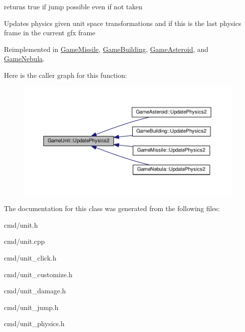 returns true if jump possible even if not taken 

Updates physics given unit space transformations and if this is the last physics frame in the current gfx frame 

Reimplemented in \hyperlink{classGameMissile_ab82fd3b8a814694c8df124d637bc9a45}{Game\+Missile}, \hyperlink{classGameBuilding_a41b1af4a3b09603e76b52cf7f7617482}{Game\+Building}, \hyperlink{classGameAsteroid_a7bc503988abf7084187034a723a08aed}{Game\+Asteroid}, and \hyperlink{classGameNebula_a3028dccb3764fba45b25990d1a31d8bb}{Game\+Nebula}.



Here is the caller graph for this function\+:
\nopagebreak
\begin{figure}[H]
\begin{center}
\leavevmode
\includegraphics[width=350pt]{de/d19/classGameUnit_af229f9e649c3dcf2f7a94082e070cc2b_icgraph}
\end{center}
\end{figure}




The documentation for this class was generated from the following files\+:\begin{DoxyCompactItemize}
\item 
cmd/unit.\+h\item 
cmd/unit.\+cpp\item 
cmd/unit\+\_\+click.\+h\item 
cmd/unit\+\_\+customize.\+h\item 
cmd/unit\+\_\+damage.\+h\item 
cmd/unit\+\_\+jump.\+h\item 
cmd/unit\+\_\+physics.\+h\end{DoxyCompactItemize}
